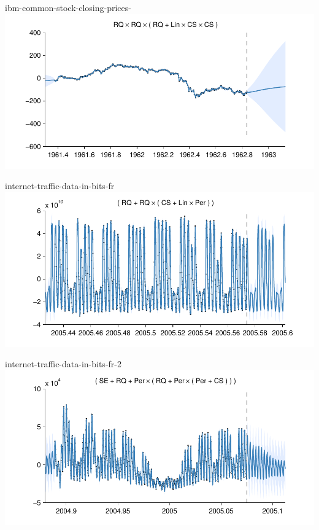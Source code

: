     
\begin{frame}{ibm-common-stock-closing-prices-}
  \center
  \includegraphics[width=1.0\textwidth]{figures/ibm-common-stock-closing-prices-/ibm-common-stock-closing-prices-_all}
\end{frame}  


    
\begin{frame}{internet-traffic-data-in-bits-fr}
  \center
  \includegraphics[width=1.0\textwidth]{figures/internet-traffic-data-in-bits-fr/internet-traffic-data-in-bits-fr_all}
\end{frame}  


    
\begin{frame}{internet-traffic-data-in-bits-fr-2}
  \center
  \includegraphics[width=1.0\textwidth]{figures/internet-traffic-data-in-bits-fr-2/internet-traffic-data-in-bits-fr-2_all}
\end{frame}  


